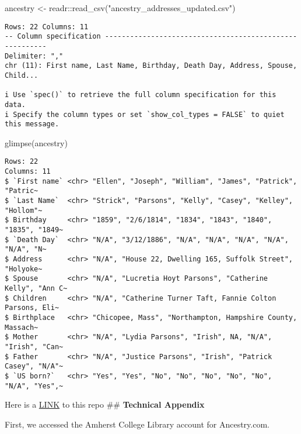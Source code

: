\documentclass[
  letterpaper,
  DIV=11,
  numbers=noendperiod]{scrartcl}
\newenvironment{Shaded}{\begin{snugshade}}{\end{snugshade}}
\newcommand{\FunctionTok}[1]{\textcolor[rgb]{0.28,0.35,0.67}{#1}}
\newcommand{\NormalTok}[1]{\textcolor[rgb]{0.00,0.23,0.31}{#1}}
\newcommand{\OtherTok}[1]{\textcolor[rgb]{0.00,0.23,0.31}{#1}}
\newcommand{\SpecialCharTok}[1]{\textcolor[rgb]{0.37,0.37,0.37}{#1}}
\newcommand{\StringTok}[1]{\textcolor[rgb]{0.13,0.47,0.30}{#1}}
\begin{document}
\begin{Shaded}
\begin{Highlighting}[]
\NormalTok{ancestry }\OtherTok{\textless{}{-}}\NormalTok{ readr}\SpecialCharTok{::}\FunctionTok{read\_csv}\NormalTok{(}\StringTok{"ancestry\_addresses\_updated.csv"}\NormalTok{)}
\end{Highlighting}
\end{Shaded}

\begin{verbatim}
Rows: 22 Columns: 11
-- Column specification --------------------------------------------------------
Delimiter: ","
chr (11): First name, Last Name, Birthday, Death Day, Address, Spouse, Child...

i Use `spec()` to retrieve the full column specification for this data.
i Specify the column types or set `show_col_types = FALSE` to quiet this message.
\end{verbatim}

\begin{Shaded}
\begin{Highlighting}[]
\FunctionTok{glimpse}\NormalTok{(ancestry)}
\end{Highlighting}
\end{Shaded}

\begin{verbatim}
Rows: 22
Columns: 11
$ `First name` <chr> "Ellen", "Joseph", "William", "James", "Patrick", "Patric~
$ `Last Name`  <chr> "Strick", "Parsons", "Kelly", "Casey", "Kelley", "Hollom"~
$ Birthday     <chr> "1859", "2/6/1814", "1834", "1843", "1840", "1835", "1849~
$ `Death Day`  <chr> "N/A", "3/12/1886", "N/A", "N/A", "N/A", "N/A", "N/A", "N~
$ Address      <chr> "N/A", "House 22, Dwelling 165, Suffolk Street", "Holyoke~
$ Spouse       <chr> "N/A", "Lucretia Hoyt Parsons", "Catherine Kelly", "Ann C~
$ Children     <chr> "N/A", "Catherine Turner Taft, Fannie Colton Parsons, Eli~
$ Birthplace   <chr> "Chicopee, Mass", "Northampton, Hampshire County, Massach~
$ Mother       <chr> "N/A", "Lydia Parsons", "Irish", NA, "N/A", "Irish", "Can~
$ Father       <chr> "N/A", "Justice Parsons", "Irish", "Patrick Casey", "N/A"~
$ `US born?`   <chr> "Yes", "Yes", "No", "No", "No", "No", "No", "N/A", "Yes",~
\end{verbatim}

Here is a
\href{https://github.com/STAT210-S23/Parsons_Paper_Register}{LINK} to
this repo \#\# \textbf{Technical Appendix}

First, we accessed the Amherst College Library account for Ancestry.com.
\end{document}
